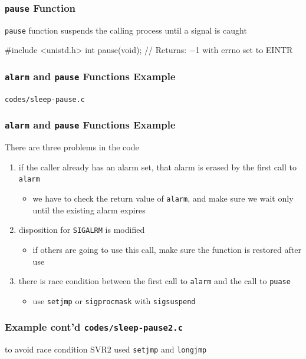 \documentclass[newPxFont,sthlmFooter,nooffset]{beamer}
\begin{document}
\begin{frame}[fragile,t]
  \frametitle{\texttt{pause} Function}

\texttt{pause} function suspends the calling process until a signal is caught
\begin{codedef}
#include <unistd.h>
int pause(void);
// Returns: −1 with errno set to EINTR
\end{codedef}

\end{frame}

\begin{frame}[fragile,t]
  \frametitle{\texttt{alarm} and \texttt{pause} Functions Example}
\texttt{codes/sleep-pause.c}

\end{frame}

\begin{frame}[fragile,t]
  \frametitle{\texttt{alarm} and \texttt{pause} Functions Example}
There are three problems in the code
\begin{enumerate}
\item <2-> if the caller already has an alarm set, that alarm is erased by the first call to \texttt{alarm}
  \begin{itemize}
  \item  we have to check the return value of \texttt{alarm}, and make sure we wait only until the existing alarm expires
  \end{itemize}
\item <3-> disposition for \texttt{SIGALRM} is modified
  \begin{itemize}
  \item if others are going to use this call, make sure the function is restored after use
  \end{itemize}
\item <4-> there is race condition between the first call to \texttt{alarm} and the call to \texttt{puase}
  \begin{itemize}
  \item  use \texttt{setjmp} or \texttt{sigprocmask} with \texttt{sigsuspend}
  \end{itemize}
\end{enumerate}
\end{frame}


\begin{frame}[fragile,t]
  \frametitle{ Example cont'd  \texttt{codes/sleep-pause2.c}}


to avoid race condition SVR2 used \texttt{setjmp} and \texttt{longjmp}


\end{frame}
\end{document}
